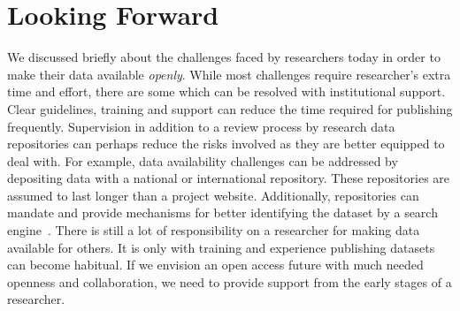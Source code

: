 \documentclass[12pt]{elsarticle}
\begin{document}
\section*{Looking Forward}
We discussed briefly about the challenges faced by researchers today in order to make their data available \textit{openly}. 
While most challenges require researcher's extra time and effort, there are some which can be resolved with institutional support. 
Clear guidelines, training and support can reduce the time required for publishing frequently. 
Supervision in addition to a review process by research data repositories can perhaps reduce the risks involved as they are better equipped to deal with. 
For example, data availability challenges can be addressed by depositing data with a national or international repository. 
These repositories are assumed to last longer than a project website. 
Additionally, repositories can mandate and provide mechanisms for better identifying the dataset by a search engine~\cite{gdataset,openaire, dataverse}. 
There is still a lot of responsibility on a researcher for making data available for others. 
It is only with training and experience publishing datasets can become habitual. 
If we envision an open access future with much needed openness and collaboration, we need to provide support from the early stages of a researcher. 

%
%
\end{document}
